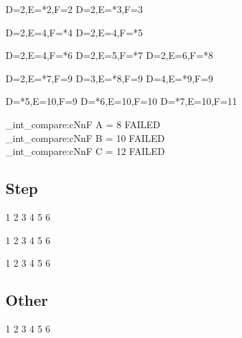 \begin{CDRBlock} [
  tags={E,F},
]
D=2,E=*2,F=2
D=2,E=*3,F=3
\end{CDRBlock}

\begin{CDRBlock} [
  tags=F,
]
D=2,E=4,F=*4
D=2,E=4,F=*5
\end{CDRBlock}

\begin{CDRBlock} [
  tags={F, E},
]
D=2,E=4,F=*6
D=2,E=5,F=*7
D=2,E=6,F=*8
\end{CDRBlock}

\begin{CDRBlock} [
  tags={E, D},
]
D=2,E=*7,F=9
D=3,E=*8,F=9
D=4,E=*9,F=9
\end{CDRBlock}
\begin{CDRBlock} [
  tags={D,F},
]
D=*5,E=10,F=9
D=*6,E=10,F=10
D=*7,E=10,F=11
\end{CDRBlock}

\ExplSyntaxOn
\CDR_int_compare:cNnF { A } = 8 { FAILED \\ }
\CDR_int_compare:cNnF { B } = {10} { FAILED \\ }
\CDR_int_compare:cNnF { C } = {12} { FAILED \\ }
\ExplSyntaxOff

\egroup

\subsection{Step}
\bgroup
\def\CDRNumberOther#1{\textcolor{magenta!25!white}{#1}\hspace{5mm}}
\begin{CDRBlock}[stepnumber=1]
1
2
3
4
5
6
\end{CDRBlock}
\begin{CDRBlock}[stepnumber=2]
1
2
3
4
5
6
\end{CDRBlock}
\begin{CDRBlock}[stepnumber=5]
1
2
3
4
5
6
\end{CDRBlock}

\egroup

\subsection{Other}
\bgroup
\begin{minipage}{0.5\textwidth}
\begin{CDRBlock}[stepnumber=5,show tags=right]
1
2
3
4
5
6
\end{CDRBlock}

\end{minipage}
\egroup

